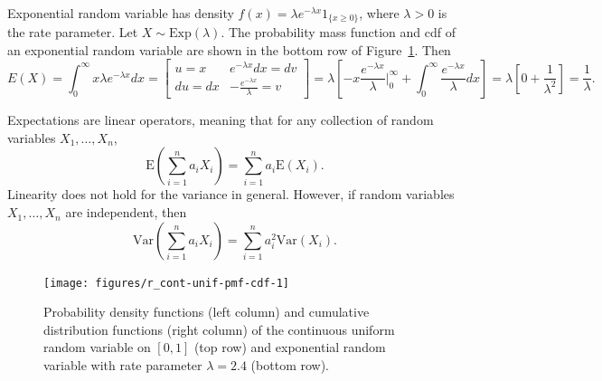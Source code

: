 \documentclass[11pt]{article}\usepackage[]{graphicx}\usepackage[]{color}
\newenvironment{knitrout}{}{} %
\numberwithin{algorithm}{section}
\newcommand{\indfun}[1]{\ensuremath{1_{\{#1\}}}}
\theoremstyle{remark}
\theoremstyle{definition}
\newenvironment{example}[1]{\begin{trivlist}
\item[\hskip \labelsep {\bfseries Example}: \underline{#1}]\ \\}{\end{trivlist}}
\begin{document}
\begin{example}{Exponential r.v.}
  Exponential random variable has density $f(x) = \lambda e^{-\lambda x} \indfun{x \ge 0}$, where $\lambda > 0$
  is the rate parameter. Let $X \sim \text{Exp}(\lambda)$. The probability mass function and 
  cdf of an exponential random variable are shown in the bottom row of Figure~\ref{cont-unif-exponential}.
  Then
  \[
  E(X) = \int_{0}^{\infty}x \lambda e^{-\lambda x} dx =
  \begin{bmatrix}
    u=x & e^{-\lambda x}dx = dv \\
    du=dx & -\frac{e^{-\lambda x}}{\lambda}=v
  \end{bmatrix} =
    \lambda \left[- x \frac{e^{-\lambda x}}{\lambda}  \Big|_{0}^{\infty}  + \int_{0}^{\infty} 
    \frac{e^{-\lambda x}}{\lambda} dx \right]= \lambda \left[0  + \frac{1}{\lambda^2}\right] = \frac{1}{\lambda}.
  \]
\end{example}


Expectations are linear operators, meaning that for any collection of random variables $X_1, \dots, X_n$,
\[
\text{E}\left(\sum_{i=1}^n a_i X_i\right) = \sum_{i=1}^n a_i \text{E}(X_i).
\]
Linearity does not hold for the variance in general. However, if random variables $X_1, \dots, X_n$ are independent, 
then 
\[
\text{Var}\left(\sum_{i=1}^n a_i X_i\right) = \sum_{i=1}^n a_i^2 \text{Var}(X_i).
\]



\begin{figure}
\centering
\begin{knitrout}
\color{fgcolor}

{\centering \texttt{[image: figures/r\_cont-unif-pmf-cdf-1]} 

}



\end{knitrout}
\caption{Probability density functions (left column) and cumulative distribution functions (right column) of the continuous uniform 
random variable on $[0,1]$ (top row) and exponential random variable with rate parameter $\lambda = 2.4$ (bottom row).}
\label{cont-unif-exponential}
\end{figure}
\end{document}
